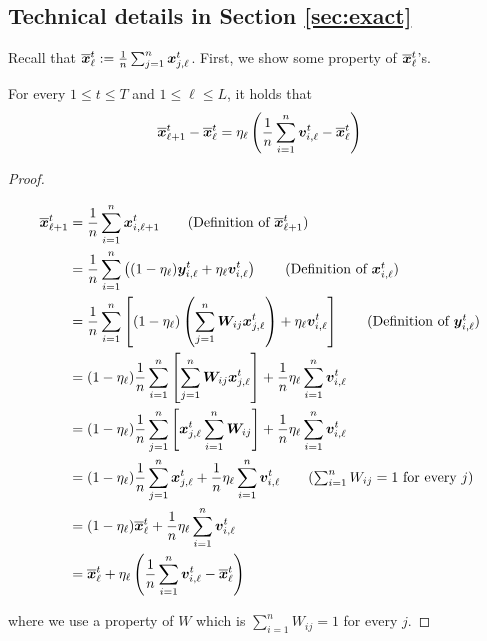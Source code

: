 \appendix

\subsection{Technical details in Section \ref{sec:exact}} 

Recall that $\overline{\bm{x}}^{t}_{\ell} := \frac{1}{n} \sum_{j=1}^{n} \bm{x}^{t}_{j,\ell}$.
First, we show some property of $\overline{\bm{x}}^{t}_{\ell}$'s. 

\begin{lemma}\label{lmm:avg}
For every $1 \leq t \leq T$ and $1 \leq \ell \leq L$, it holds that 
\begin{equation}
  \overline{\bm{x}}^t_{\ell+1} - \overline{\bm{x}}^t_{\ell} = \eta_{\ell} \left( \frac{1}{n}\sum_{i=1}^{n} \bm{v}^t_{i,\ell} - \overline{\bm{x}}^t_{\ell}\right)
\end{equation}
\end{lemma} 

\begin{proof}
\begin{linenomath}
\begin{align*}
\overline{\vect{x}}_{\ell+1}^t 
&= \frac{1}{n} \sum_{i=1}^{n} \vect{x}^{t}_{i,\ell + 1} \tag{Definition of $\overline{\vect{x}}_{\ell+1}^t$}
\\
&= \frac{1}{n} \sum_{i=1}^{n} \left ((1-\eta_{\ell}) \vect{y}^{t}_{i,\ell} + \eta_{\ell} \vect{v}_{i,\ell}^t \right )  \tag{Definition of $\vect{x}_{i,\ell}^t$} 
\\
&= \frac{1}{n} \sum_{i=1}^{n} \left [ (1-\eta_{\ell}) \left ( \sum_{j=1}^n \vect{W}_{ij} \vect{x}_{j,\ell}^t  \right ) + \eta_{\ell} \vect{v}_{i,\ell}^t \right ] \tag{Definition of $\vect{y}_{i,\ell}^t$}
\\
&= (1 - \eta_{\ell}) \frac{1}{n} \sum_{i=1}^n \left [ \sum_{j=1}^n \vect{W}_{ij}\vect{x}_{j,\ell}^t \right ] + \frac{1}{n}\eta_{\ell} \sum_{i=1}^n \vect{v}_{i,\ell}^t
\\
&= (1 - \eta_{\ell}) \frac{1}{n} \sum_{j=1}^n \left [ \vect{x}_{j,\ell}^t \sum_{i=1}^n \vect{W}_{ij} \right ] + \frac{1}{n} \eta_{\ell} \sum_{i=1}^n \vect{v}_{i,\ell}^t
\\
&= (1 - \eta_{\ell}) \frac{1}{n} \sum_{j=1}^n \vect{x}_{j,\ell}^t + \frac{1}{n} \eta_{\ell} \sum_{i=1}^n \vect{v}_{i,\ell}^t \tag{$\sum_{i=1}^n W_{ij} =1$ for every $j$}
\\
&= (1 - \eta_{\ell}) \overline{\vect{x}}_{\ell}^t + \frac{1}{n} \eta_{\ell} \sum_{i=1}^n \vect{v}_{i,\ell}^t
\\
&= \overline{\vect{x}}_{\ell}^t + \eta_{\ell} \left ( \frac{1}{n} \sum_{i=1}^n \vect{v}_{i,\ell}^t - \overline{\vect{x}}_{\ell}^t \right )
\end{align*}
\end{linenomath}
where we use a property of $W$ which is $\sum_{i = 1}^{n} W_{ij} = 1$ for every $j$.
\end{proof}


